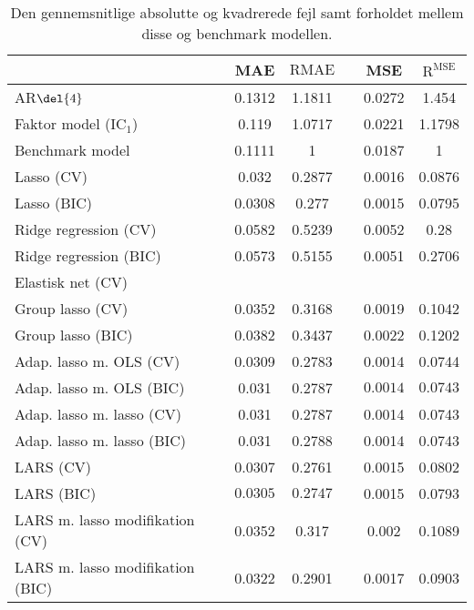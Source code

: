 \begin{table}[ht]
\center
\begin{tabular}{lccccc}
\toprule
 & MAE & \(\text{R}{\text{MAE}}\) && MSE & \(\text{R}^{\text{MSE}}\) \\ \midrule
AR\(\del{4}\) & 0.1312 & 1.1811 && 0.0272 & 1.454 \\  
Faktor model (IC\(_1\)) & 0.119 & 1.0717 && 0.0221 & 1.1798 \\
Benchmark model & 0.1111 & 1 && 0.0187 & 1 \\
Lasso (CV) & 0.032 & 0.2877 && 0.0016 & 0.0876 \\
Lasso (BIC) & 0.0308 & 0.277 && 0.0015 & 0.0795 \\
Ridge regression (CV) & 0.0582 & 0.5239 && 0.0052 & 0.28 \\
Ridge regression (BIC) & 0.0573 & 0.5155 && 0.0051 & 0.2706 \\
Elastisk net (CV) & & && & \\
Group lasso (CV) & 0.0352 & 0.3168 && 0.0019 & 0.1042  \\
Group lasso (BIC) & 0.0382 & 0.3437 && 0.0022 & 0.1202 \\
Adap. lasso m. OLS (CV) & 0.0309 & 0.2783 && 0.0014 & 0.0744 \\
Adap. lasso m. OLS (BIC) & 0.031 & 0.2787 && $\mathbf{0.0014}$ & $\mathbf{0.0743}$ \\
Adap. lasso m. lasso (CV) & 0.031 & 0.2787 && 0.0014 & 0.0743 \\
Adap. lasso m. lasso (BIC) & 0.031 & 0.2788 && 0.0014 & 0.0743 \\
LARS (CV) &  0.0307 & 0.2761 && 0.0015 & 0.0802 \\
LARS (BIC) & $\mathbf{0.0305}$ & $\mathbf{0.2747}$ && 0.0015 & 0.0793 \\
LARS m. lasso modifikation (CV) &  0.0352 & 0.317 && 0.002 & 0.1089 \\
LARS m. lasso modifikation (BIC) & 0.0322 & 0.2901 && 0.0017 & 0.0903 \\ \bottomrule
\end{tabular}
\caption{Den gennemsnitlige absolutte og kvadrerede fejl samt forholdet mellem disse og benchmark modellen.} \label{tab:mae_mse_vurdering}
\end{table}
